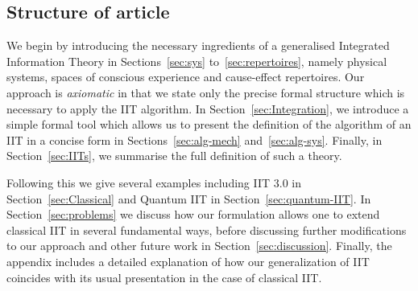 \subsection{Structure of article}
We begin by introducing the necessary ingredients of a generalised Integrated Information Theory in Sections~\ref{sec:sys} to~\ref{sec:repertoires}, 
namely physical systems, spaces of conscious experience and cause-effect repertoires. Our approach is \emph{axiomatic} in that we state only the precise formal structure which is necessary to apply the IIT algorithm. In Section~\ref{sec:Integration}, we introduce a simple formal tool which allows us to present the definition of the algorithm of an IIT in a concise form in Sections~\ref{sec:alg-mech} and~\ref{sec:alg-sys}. Finally, in Section~\ref{sec:IITs}, we summarise the full definition of such a theory.

Following this we give several examples including IIT 3.0 in Section~\ref{sec:Classical} and Quantum IIT in Section~\ref{sec:quantum-IIT}. In Section~\ref{sec:problems} we discuss how our formulation allows one to extend classical IIT in several fundamental ways, before discussing further modifications to our approach and other future work in Section~\ref{sec:discussion}.  Finally, the appendix includes a detailed explanation of how our generalization of IIT coincides with its usual presentation in the case of classical IIT. 